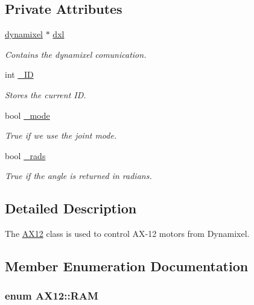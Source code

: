 \subsection*{Private Attributes}
\begin{DoxyCompactItemize}
\item 
\hyperlink{classdynamixel}{dynamixel} $\ast$ \hyperlink{class_a_x12_af48e370f92f69214a27618d5b69bcfe8}{dxl}
\begin{DoxyCompactList}\small\item\em Contains the dynamixel comunication. \end{DoxyCompactList}\item 
int \hyperlink{class_a_x12_a0ae2b35fee3d120075e1d8f1e2055804}{\+\_\+\+I\+D}
\begin{DoxyCompactList}\small\item\em Stores the current I\+D. \end{DoxyCompactList}\item 
bool \hyperlink{class_a_x12_a2fd07e2e636003227a32d09d211bd6d4}{\+\_\+mode}
\begin{DoxyCompactList}\small\item\em True if we use the joint mode. \end{DoxyCompactList}\item 
bool \hyperlink{class_a_x12_aba71492043d7a3226f0793db57372bec}{\+\_\+rads}
\begin{DoxyCompactList}\small\item\em True if the angle is returned in radians. \end{DoxyCompactList}\end{DoxyCompactItemize}


\subsection{Detailed Description}
The \hyperlink{class_a_x12}{A\+X12} class is used to control A\+X-\/12 motors from Dynamixel. 

\subsection{Member Enumeration Documentation}
\hypertarget{class_a_x12_a672068c48bbee921e5856cc44b1c81c1}{}
\subsubsection[{R\+A\+M}]{\setlength{\rightskip}{0pt plus 5cm}enum {\bf A\+X12\+::\+R\+A\+M}\hspace{0.3cm}{\ttfamily [private]}}\label{class_a_x12_a672068c48bbee921e5856cc44b1c81c1}


